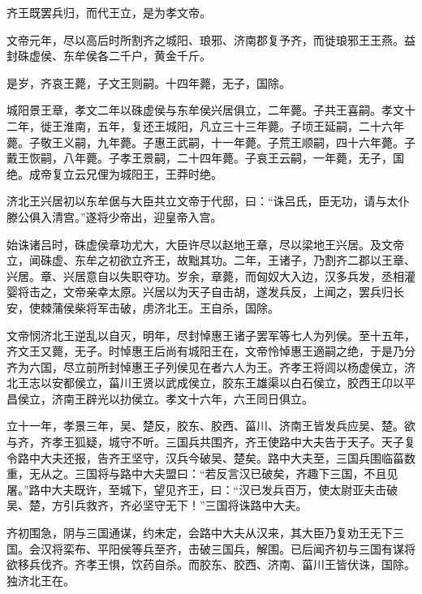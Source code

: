 \documentclass[12pt,UTF8]{ctexbook}
\begin{document}
齐王既罢兵归，而代王立，是为孝文帝。



文帝元年，尽以高后时所割齐之城阳、琅邪、济南郡复予齐，而徙琅邪王王燕。益封硃虚侯、东牟侯各二千户，黄金千斤。



是岁，齐哀王薨，子文王则嗣。十四年薨，无子，国除。



城阳景王章，孝文二年以硃虚侯与东牟侯兴居俱立，二年薨。子共王喜嗣。孝文十二年，徙王淮南，五年，复还王城阳，凡立三十三年薨。子顷王延嗣，二十六年薨。子敬王义嗣，九年薨。子惠王武嗣，十一年薨。子荒王顺嗣，四十六年薨。子戴王恢嗣，八年薨。子孝王景嗣，二十四年薨。子哀王云嗣，一年薨，无子，国绝。成帝复立云兄俚为城阳王，王莽时绝。



济北王兴居初以东牟倨与大臣共立文帝于代邸，曰：“诛吕氏，臣无功，请与太仆滕公俱入清宫。”遂将少帝出，迎皇帝入宫。



始诛诸吕时，硃虚侯章功尤大，大臣许尽以赵地王章，尽以梁地王兴居。及文帝立，闻硃虚、东牟之初欲立齐王，故黜其功。二年，王诸子，乃割齐二郡以王章、兴居。章、兴居意自以失职夺功。岁余，章薨，而匈奴大入边，汉多兵发，丞相灌婴将击之，文帝亲幸太原。兴居以为天子自击胡，遂发兵反，上闻之，罢兵归长安，使棘蒲侯柴将军击破，虏济北王。王自杀，国除。



文帝悯济北王逆乱以自灭，明年，尽封悼惠王诸子罢军等七人为列侯。至十五年，齐文王又薨，无子。时悼惠王后尚有城阳王在，文帝怜悼惠王適嗣之绝，于是乃分齐为六国，尽立前所封悼惠王子列侯见在者六人为王。齐孝王将闾以杨虚侯立，济北王志以安都侯立，菑川王贤以武成侯立，胶东王雄渠以白石侯立，胶西王卬以平昌侯立，济南王辟光以扐侯立。孝文十六年，六王同日俱立。



立十一年，孝景三年，吴、楚反，胶东、胶西、菑川、济南王皆发兵应吴、楚。欲与齐，齐孝王狐疑，城守不听。三国兵共围齐，齐王使路中大夫告于天子。天子复令路中大夫还报，告齐王坚守，汉兵今破吴、楚矣。路中大夫至，三国兵围临菑数重，无从之。三国将与路中大夫盟曰：“若反言汉已破矣，齐趣下三国，不且见屠。”路中大夫既许，至城下，望见齐王，曰：“汉已发兵百万，使太尉亚夫击破吴、楚，方引兵救齐，齐必坚守无下！”三国将诛路中大夫。



齐初围急，阴与三国通谋，约未定，会路中大夫从汉来，其大臣乃复劝王无下三国。会汉将栾布、平阳侯等兵至齐，击破三国兵，解围。已后闻齐初与三国有谋将欲移兵伐齐。齐孝王惧，饮药自杀。而胶东、胶西、济南、菑川王皆伏诛，国除。独济北王在。
\end{document}

